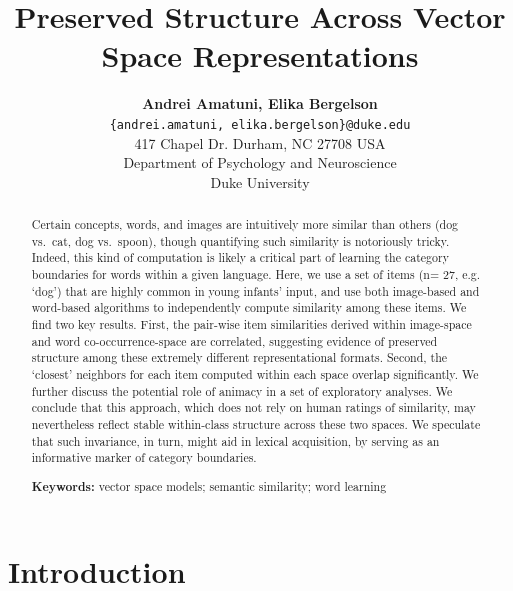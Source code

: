 \documentclass[10pt, letterpaper]{article}
\title{Preserved Structure Across Vector Space Representations}
\author{{\large \bf Andrei Amatuni, Elika Bergelson} \\ \texttt{\{andrei.amatuni, elika.bergelson\}@duke.edu} \\ 417 Chapel Dr. Durham, NC 27708 USA \\ Department of Psychology and Neuroscience \\ Duke University}
\begin{document}
\maketitle

\begin{abstract}
Certain concepts, words, and images are intuitively more similar than
others (dog vs.~cat, dog vs.~spoon), though quantifying such similarity
is notoriously tricky. Indeed, this kind of computation is likely a
critical part of learning the category boundaries for words within a
given language. Here, we use a set of items (n= 27, e.g. `dog') that are
highly common in young infants' input, and use both image-based and
word-based algorithms to independently compute similarity among these
items. We find two key results. First, the pair-wise item similarities
derived within image-space and word co-occurrence-space are correlated,
suggesting evidence of preserved structure among these extremely
different representational formats. Second, the `closest' neighbors for
each item computed within each space overlap significantly. We further
discuss the potential role of animacy in a set of exploratory analyses.
We conclude that this approach, which does not rely on human ratings of
similarity, may nevertheless reflect stable within-class structure
across these two spaces. We speculate that such invariance, in turn,
might aid in lexical acquisition, by serving as an informative marker of
category boundaries.

\textbf{Keywords:}
vector space models; semantic similarity; word learning
\end{abstract}

\section{Introduction}\label{introduction}
\end{document}
